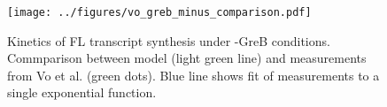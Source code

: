 \begin{figure}
    \begin{center}
        \texttt{[image: ../figures/vo\_greb\_minus\_comparison.pdf]}
    \end{center}
    \caption{Kinetics of FL transcript synthesis under -GreB conditions.
      Commparison between model (light green line) and measurements from Vo
      et al. \cite{vo_vitro_2003-1} (green dots). Blue line shows fit of
      measurements to a single exponential function.}
\label{fig:vo_comparison}
\end{figure}

